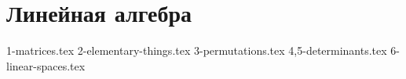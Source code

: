 \section{Линейная алгебра}
{1-matrices.tex}
{2-elementary-things.tex}
{3-permutations.tex}
{4,5-determinants.tex}
{6-linear-spaces.tex}
